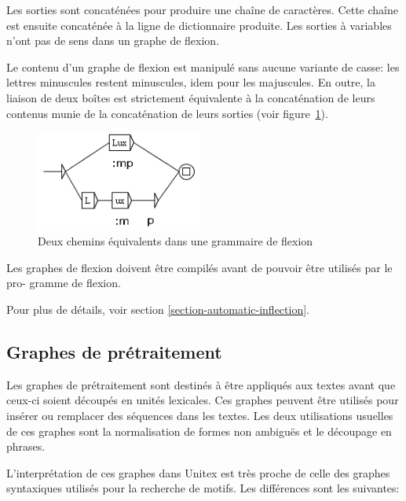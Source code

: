 \bigskip
\noindent Les sorties sont concaténées pour produire une chaîne de caractères. Cette chaîne est
ensuite concaténée à la ligne de dictionnaire produite. Les sorties à variables n’ont pas de
sens dans un graphe de flexion.


\bigskip
\noindent Le contenu d’un graphe de flexion est manipulé sans aucune variante de casse: les lettres
minuscules restent minuscules, idem pour les majuscules. En outre, la liaison de deux boîtes
est strictement équivalente à la concaténation de leurs contenus munie de la concaténation
de leurs sorties (voir figure~\ref{fig-equivalent-inflection-paths}).

\bigskip
\begin{figure}[!h]
\begin{center}
\includegraphics[width=5.5cm]{resources/img/fig6-2.png}
\caption{Deux chemins équivalents dans une grammaire de flexion\label{fig-equivalent-inflection-paths}}
\end{center}
\end{figure}

\bigskip
\noindent Les graphes de flexion doivent être compilés avant de pouvoir être utilisés par le pro-
gramme de flexion.


\bigskip
\noindent Pour plus de détails, voir section
\ref{section-automatic-inflection}.

\subsection{Graphes de prétraitement}
Les graphes de prétraitement sont destinés à être appliqués aux textes avant que ceux-ci soient
découpés en unités lexicales. Ces graphes peuvent être utilisés pour insérer ou
remplacer des séquences dans les textes. Les deux utilisations usuelles de ces graphes sont
la normalisation de formes non ambiguës et le découpage en phrases.


\bigskip
\noindent L’interprétation de ces graphes dans Unitex est très proche de celle des graphes
syntaxiques utilisés pour la recherche de motifs. Les différences sont les suivantes:

